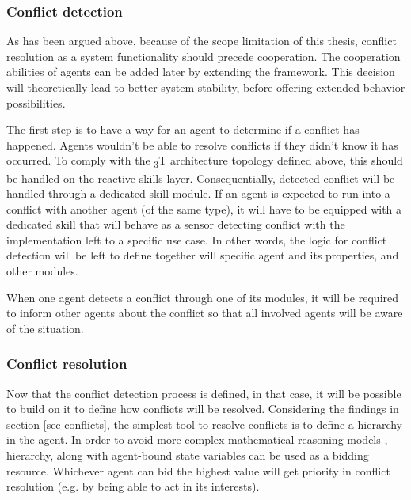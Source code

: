 \documentclass[0main.tex]{subfiles}
\begin{document}

\subsubsection{Conflict detection}

As has been argued above, because of the scope limitation of this thesis, 
conflict resolution as a system functionality should precede cooperation. The cooperation 
abilities of agents can be added later by extending the framework.
This decision will theoretically lead to better system stability, before offering extended
behavior possibilities. 

The first step is to have a way for an agent to determine if a conflict has happened. Agents wouldn't be 
able to resolve conflicts if they didn't know it has occurred. To comply with the \textsubscript{3}T
architecture topology defined above, this should be handled on the reactive skills layer. 
Consequentially, detected conflict will be handled through a dedicated skill module. If an
agent is expected to run into a conflict with another agent (of the same 
 type), it will have to be equipped with a dedicated skill that will behave as a sensor detecting conflict 
with the implementation left to a specific use case. In other words, the logic for conflict detection will be 
left to define together will specific agent and its properties, and other modules.

When one agent detects a conflict through one of its modules, it will 
be required to inform other agents about the conflict so that all involved agents will be
aware of the situation. 

\subsubsection{Conflict resolution}

Now that the conflict detection process is defined, in that case, it will be possible to build
on it to define how conflicts will be resolved. Considering the findings in section
\ref{sec-conflicts}, the simplest tool to resolve conflicts is to define a hierarchy in the
agent. In order to avoid more complex mathematical reasoning models \cite{Binder2022},
hierarchy, along with agent-bound state variables can be used as a bidding resource. Whichever
agent can bid the highest value will get priority in conflict resolution (e.g. by being
able to act in its interests).
\end{document}
